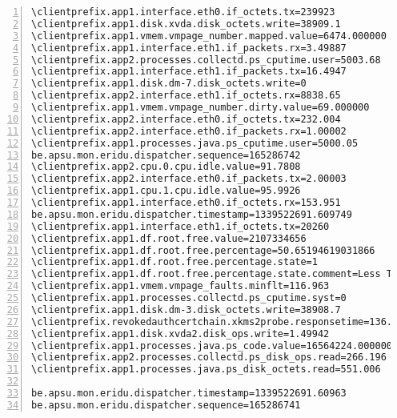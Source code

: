 \documentclass[10pt]{article}
\begin{document}
\begin{Verbatim}[numbers=left,commandchars=\\\{\},numbersep=6pt,fontsize=\small]
\clientprefix.app1.interface.eth0.if_octets.tx=239923
\clientprefix.app1.disk.xvda.disk_octets.write=38909.1
\clientprefix.app1.vmem.vmpage_number.mapped.value=6474.000000
\clientprefix.app1.interface.eth1.if_packets.rx=3.49887
\clientprefix.app2.processes.collectd.ps_cputime.user=5003.68
\clientprefix.app1.interface.eth1.if_packets.tx=16.4947
\clientprefix.app1.disk.dm-7.disk_octets.write=0
\clientprefix.app2.interface.eth1.if_octets.rx=8838.65
\clientprefix.app1.vmem.vmpage_number.dirty.value=69.000000
\clientprefix.app2.interface.eth0.if_octets.tx=232.004
\clientprefix.app2.interface.eth0.if_packets.rx=1.00002
\clientprefix.app1.processes.java.ps_cputime.user=5000.05
be.apsu.mon.eridu.dispatcher.sequence=165286742
\clientprefix.app2.cpu.0.cpu.idle.value=91.7808
\clientprefix.app2.interface.eth0.if_packets.tx=2.00003
\clientprefix.app1.cpu.1.cpu.idle.value=95.9926
\clientprefix.app1.interface.eth0.if_octets.rx=153.951
be.apsu.mon.eridu.dispatcher.timestamp=1339522691.609749
\clientprefix.app1.interface.eth1.if_octets.tx=20260
\clientprefix.app1.df.root.free.value=2107334656
\clientprefix.app1.df.root.free.percentage=50.65194619031866
\clientprefix.app1.df.root.free.percentage.state=1
\clientprefix.app1.df.root.free.percentage.state.comment=Less Than 60% Free Space
\clientprefix.app1.vmem.vmpage_faults.minflt=116.963
\clientprefix.app1.processes.collectd.ps_cputime.syst=0
\clientprefix.app1.disk.dm-3.disk_octets.write=38908.7
\clientprefix.revokedauthcertchain.xkms2probe.responsetime=136.000000
\clientprefix.app1.disk.xvda2.disk_ops.write=1.49942
\clientprefix.app1.processes.java.ps_code.value=16564224.000000
\clientprefix.app2.processes.collectd.ps_disk_ops.read=266.196
\clientprefix.app1.processes.java.ps_disk_octets.read=551.006

be.apsu.mon.eridu.dispatcher.timestamp=1339522691.60963
be.apsu.mon.eridu.dispatcher.sequence=165286741

\end{Verbatim}
\end{document}
